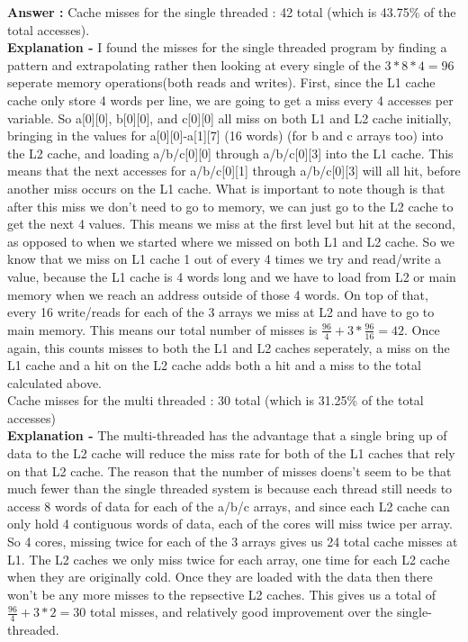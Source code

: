 \documentclass[a4paper,11pt]{article}
\newcommand{\answer}{\textbf{Answer : }}
\begin{document}
\answer 
Cache misses for the single threaded : 42 total (which is 43.75\% of the total accesses). \\
\textbf{Explanation - }I found the misses for the single threaded program by finding a pattern and extrapolating rather then looking at every single of the $3*8*4 = 96$ seperate memory operations(both reads and writes). First, since the L1 cache cache only store 4 words per line, we are going to get a miss every 4 accesses per variable. So a[0][0], b[0][0], and c[0][0] all miss on both L1 and L2 cache initially, bringing in the values for a[0][0]-a[1][7] (16 words) (for b and c arrays too) into the L2 cache, and loading a/b/c[0][0] through a/b/c[0][3] into the L1 cache. This means that the next accesses for a/b/c[0][1] through a/b/c[0][3] will all hit, before another miss occurs on the L1 cache. What is important to note though is that after this miss we don't need to go to memory, we can just go to the L2 cache to get the next 4 values. This means we miss at the first level but hit at the second, as opposed to when we started where we missed on both L1 and L2 cache. So we know that we miss on L1 cache 1 out of every 4 times we try and read/write a value, because the L1 cache is 4 words long and we have to load from L2 or main memory when we reach an address outside of those 4 words. On top of that, every 16 write/reads for each of the 3 arrays we miss at L2 and have to go to main memory. This means our total number of misses is $\frac{96}{4} + 3*\frac{96}{16} = 42$. Once again, this counts misses to both the L1 and L2 caches seperately, a miss on the L1 cache and a hit on the L2 cache adds both a hit and a miss to the total calculated above. \\

Cache misses for the multi threaded : 30 total (which is 31.25\% of the total accesses)       \\
\textbf{Explanation - } The multi-threaded has the advantage that a single bring up of data to the L2 cache will reduce the miss rate for both of the L1 caches that rely on that L2 cache. The reason that the number of misses doens't seem to be that much fewer than the single threaded system is because each thread still needs to access 8 words of data for each of the a/b/c arrays, and since each L2 cache can only hold 4 contiguous words of data, each of the cores will miss twice per array. So 4 cores, missing twice for each of the 3 arrays gives us 24 total cache misses at L1. The L2 caches we only miss twice for each array, one time for each L2 cache when they are originally cold. Once they are loaded with the data then there won't be any more misses to the repsective L2 caches. This gives us a total of $\frac{96}{4}+3*2 = 30$ total misses, and relatively good improvement over the single-threaded.
\end{document}

